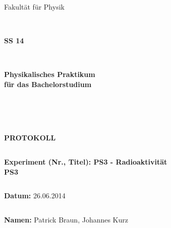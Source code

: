 \documentclass[12pt,a4paper]{article}
\begin{document}
\thispagestyle{empty}
			\begin{center}
			\Large{Fakultät für Physik}\\
			\end{center}
\begin{verbatim}


\end{verbatim}
			\begin{center}
			\textbf{\LARGE SS 14}
			\end{center}
\begin{verbatim}


\end{verbatim}
			\begin{center}
			\textbf{\LARGE{Physikalisches Praktikum\\ für das Bachelorstudium}}
			\end{center}
\begin{verbatim}




\end{verbatim}

			\begin{center}
			\textbf{\LARGE{PROTOKOLL}}
			\end{center}
			
\begin{verbatim}

\end{verbatim}

			\begin{flushleft}
			\textbf{\Large{Experiment (Nr., Titel): PS3 - Radioaktivität}\\
			\LARGE{PS3}}	
			\end{flushleft}

\begin{verbatim}

\end{verbatim}	
			\begin{flushleft}
			\textbf{\Large{Datum:}} \Large{26.06.2014}
			\end{flushleft}
			
\begin{verbatim}
\end{verbatim}
		\begin{flushleft}
			\textbf{\Large{Namen:}} \Large{Patrick Braun, Johannes Kurz}
			\end{flushleft}
\end{document}
